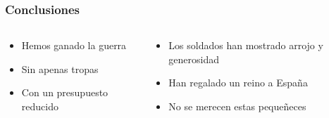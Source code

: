 \documentclass{beamer}
\begin{document}
\begin{frame}
\frametitle{Conclusiones}

\begin{columns}
\begin{column}{0.4\textwidth}
\begin{itemize}
\item Hemos ganado la guerra
\item Sin apenas tropas
\item Con un presupuesto reducido
\end{itemize}
\end{column}
\begin{column}{0.6\textwidth}
\begin{itemize}
\item Los soldados han mostrado arrojo y generosidad
\item Han regalado un reino a España
\item No se merecen estas pequeñeces
\end{itemize}
\end{column}
\end{columns}

\end{frame}
\end{document}
